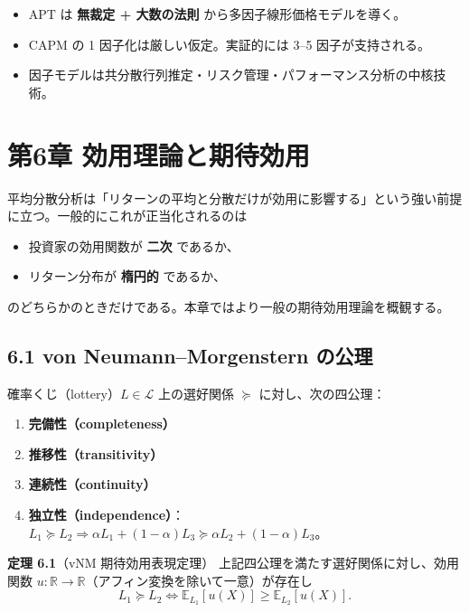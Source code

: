 \documentclass[11pt,a4paper]{report}
\begin{document}
\begin{itemize}
\item APT は \textbf{無裁定 + 大数の法則} から多因子線形価格モデルを導く。
\item CAPM の 1 因子化は厳しい仮定。実証的には 3–5 因子が支持される。
\item 因子モデルは共分散行列推定・リスク管理・パフォーマンス分析の中核技術。
\end{itemize}

\noindent\hrulefill

\chapter{第6章 効用理論と期待効用}

平均分散分析は「リターンの平均と分散だけが効用に影響する」という強い前提に立つ。一般的にこれが正当化されるのは

\begin{itemize}
\item 投資家の効用関数が \textbf{二次} であるか、
\item リターン分布が \textbf{楕円的} であるか、
\end{itemize}

のどちらかのときだけである。本章ではより一般の期待効用理論を概観する。

\section{6.1 von Neumann–Morgenstern の公理}

確率くじ（lottery）$L \in \mathcal{L}$ 上の選好関係 $\succeq$ に対し、次の四公理：

\begin{enumerate}
\item \textbf{完備性（completeness）}
\item \textbf{推移性（transitivity）}
\item \textbf{連続性（continuity）}
\item \textbf{独立性（independence）}：$L_1 \succeq L_2 \Rightarrow \alpha L_1 + (1-\alpha) L_3 \succeq \alpha L_2 + (1-\alpha) L_3$。
\end{enumerate}

\textbf{定理 6.1}（vNM 期待効用表現定理） 上記四公理を満たす選好関係に対し、効用関数 $u: \mathbb{R} \to \mathbb{R}$（アフィン変換を除いて一意）が存在し \[ L_1 \succeq L_2 \iff \mathbb{E}_{L_1}[u(X)] \ge \mathbb{E}_{L_2}[u(X)]. \]
\end{document}

